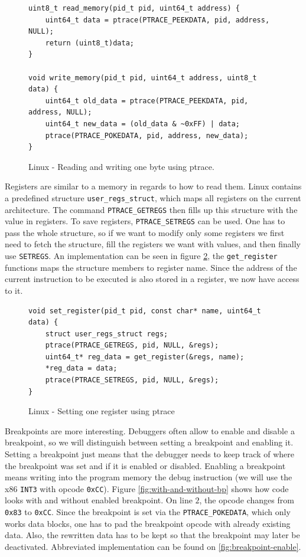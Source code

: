 \begin{figure}\label{fig:write-read}
    \begin{verbatim}
uint8_t read_memory(pid_t pid, uint64_t address) {
    uint64_t data = ptrace(PTRACE_PEEKDATA, pid, address, NULL);
    return (uint8_t)data;
}

void write_memory(pid_t pid, uint64_t address, uint8_t data) {
    uint64_t old_data = ptrace(PTRACE_PEEKDATA, pid, address, NULL);
    uint64_t new_data = (old_data & ~0xFF) | data;
    ptrace(PTRACE_POKEDATA, pid, address, new_data);
}
    \end{verbatim}
    \caption{Linux - Reading and writing one byte using ptrace.}
\end{figure}

Registers are similar to a memory in regards to how to read them. Linux
contains a predefined structure \texttt{user\_regs\_struct}, which maps all
registers on the current architecture. The command \texttt{PTRACE\_GETREGS}
then fills up this structure with the value in registers. To save registers,
\texttt{PTRACE\_SETREGS} can be used. One has to pass the whole structure, so
if we want to modify only some registers we first need to fetch the structure,
fill the registers we want with values, and then finally use \texttt{SETREGS}.
An implementation can be seen in figure \ref{fig:set-register}, the
\texttt{get\_register} functions maps the structure members to register name.
Since the address of the current instruction to be executed is also stored in a
register, we now have access to it.

\begin{figure}\label{fig:set-register}
    \begin{verbatim}
void set_register(pid_t pid, const char* name, uint64_t data) {
    struct user_regs_struct regs;
    ptrace(PTRACE_GETREGS, pid, NULL, &regs);
    uint64_t* reg_data = get_register(&regs, name);
    *reg_data = data;
    ptrace(PTRACE_SETREGS, pid, NULL, &regs);
}
    \end{verbatim}
    \caption{Linux - Setting one register using ptrace}
\end{figure}

Breakpoints are more interesting. Debuggers often allow to enable and disable a
breakpoint, so we will distinguish between setting a breakpoint and enabling
it. Setting a breakpoint just means that the debugger needs to keep track of
where the breakpoint was set and if it is enabled or disabled. Enabling a
breakpoint means writing into the program memory the debug instruction (we will
use the x86 \texttt{INT3} with opcode \texttt{0xCC}). Figure
\ref{fig:with-and-without-bp} shows how code looks with and without enabled
breakpoint. On line $2$, the opcode changes from \texttt{0x83} to
\texttt{0xCC}. Since the breakpoint is set via the \texttt{PTRACE\_POKEDATA},
which only works data blocks, one has to pad the breakpoint opcode with already
existing data. Also, the rewritten data has to be kept so that the breakpoint
may later be deactivated. Abbreviated implementation can be found on
\ref{fig:breakpoint-enable}.

